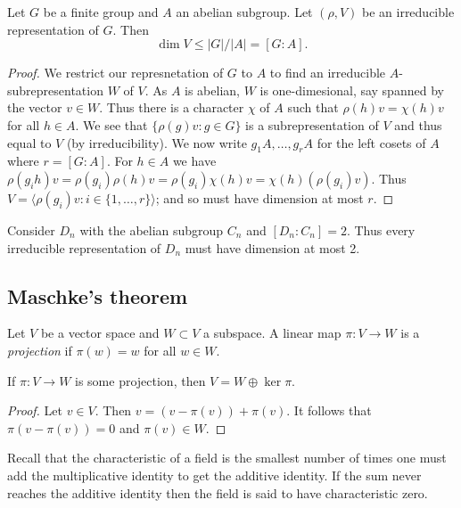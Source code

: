 \begin{proposition}
  Let $G$ be a finite group and $A$ an abelian subgroup. Let $(\rho, V)$ be an irreducible representation of $G$. Then \[\dim V \leq \lvert G \rvert / \lvert A \rvert = [G: A].\]
\end{proposition}

\begin{proof}
  We restrict our represnetation of $G$ to $A$ to find an irreducible $A$-subrepresentation $W$ of $V$. As $A$ is abelian, $W$ is one-dimesional, say spanned by the vector $v \in W$. Thus there is a character $\chi$ of $A$ such that $\rho(h)v = \chi(h)v$ for all $h \in A$. We see that $\{\rho(g)v: g \in G\}$ is a subrepresentation of $V$ and thus equal to $V$ (by irreducibility). We now write $g_1A, \ldots, g_rA$ for the left cosets of $A$ where $r = [G:A]$. For $h \in A$ we have $\rho(g_ih)v = \rho(g_i)\rho(h)v=\rho(g_i)\chi(h)v=\chi(h)(\rho(g_i)v)$. Thus $V = \langle \rho(g_i)v : i \in \{1,\ldots,r\} \rangle$; and so must have dimension at most $r$.
\end{proof}

\begin{example}
  Consider $D_n$ with the abelian subgroup $C_n$ and $[D_n: C_n] = 2$. Thus every irreducible representation of $D_n$ must have dimension at most 2.
\end{example}

\subsection{Maschke's theorem}

\begin{definition}[Projection]
  Let $V$ be a vector space and $W \subset V$ a subspace. A linear map $\pi: V \to W$ is a \emph{projection} if $\pi(w) = w$ for all $w \in W$.
\end{definition}

\begin{lemma}
  If $\pi: V \to W$ is some projection, then $V = W \oplus \ker\pi$.
\end{lemma}

\begin{proof}
  Let $v \in V$. Then $v = (v - \pi(v)) + \pi(v)$. It follows that $\pi(v - \pi(v)) = 0$ and $\pi(v) \in W$.
\end{proof}

Recall that the characteristic of a field is the smallest number of times one must add the multiplicative identity to get the additive identity. If the sum never reaches the additive identity then the field is said to have characteristic zero.

